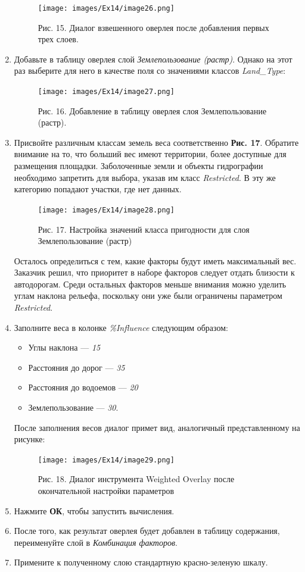 \documentclass[12pt,]{book}
\begin{document}
\begin{enumerate}
  \begin{figure}
  \centering
  \texttt{[image: images/Ex14/image26.png]}
  \caption{Рис. 15. Диалог взвешенного оверлея после добавления первых трех слоев.}
  \end{figure}
\item
  Добавьте в таблицу оверлея слой \emph{Землепользование (растр)}. Однако на этот раз выберите для него в качестве поля со значениями классов \emph{Land\_Type}:

  \begin{figure}
  \centering
  \texttt{[image: images/Ex14/image27.png]}
  \caption{Рис. 16. Добавление в таблицу оверлея слоя Землепользование (растр).}
  \end{figure}
\item
  Присвойте различным классам земель веса соответственно \textbf{Рис. 17}. Обратите внимание на то, что больший вес имеют территории, более доступные для размещения площадки. Заболоченные земли и объекты гидрографии необходимо запретить для выбора, указав им класс \emph{Restricted}. В эту же категорию попадают участки, где нет данных.

  \begin{figure}
  \centering
  \texttt{[image: images/Ex14/image28.png]}
  \caption{Рис. 17. Настройка значений класса пригодности для слоя Землепользование (растр)}
  \end{figure}

  Осталось определиться с тем, какие факторы будут иметь максимальный вес. Заказчик решил, что приоритет в наборе факторов следует отдать близости к автодорогам. Среди остальных факторов меньше внимания можно уделить углам наклона рельефа, поскольку они уже были ограничены параметром \emph{Restricted}.
\item
  Заполните веса в колонке \emph{\%Influence} следующим образом:

  \begin{itemize}
  \item
    Углы наклона --- \emph{15}
  \item
    Расстояния до дорог --- \emph{35}
  \item
    Расстояния до водоемов --- \emph{20}
  \item
    Землепользование --- \emph{30}.
  \end{itemize}

  После заполнения весов диалог примет вид, аналогичный представленному на рисунке:

  \begin{figure}
  \centering
  \texttt{[image: images/Ex14/image29.png]}
  \caption{Рис. 18. Диалог инструмента Weighted Overlay после окончательной настройки параметров}
  \end{figure}
\item
  Нажмите \textbf{ОК}, чтобы запустить вычисления.
\item
  После того, как результат оверлея будет добавлен в таблицу содержания, переименуйте слой в \emph{Комбинация факторов}.
\item
  Примените к полученному слою стандартную красно-зеленую шкалу.
\end{enumerate}
\end{document}
